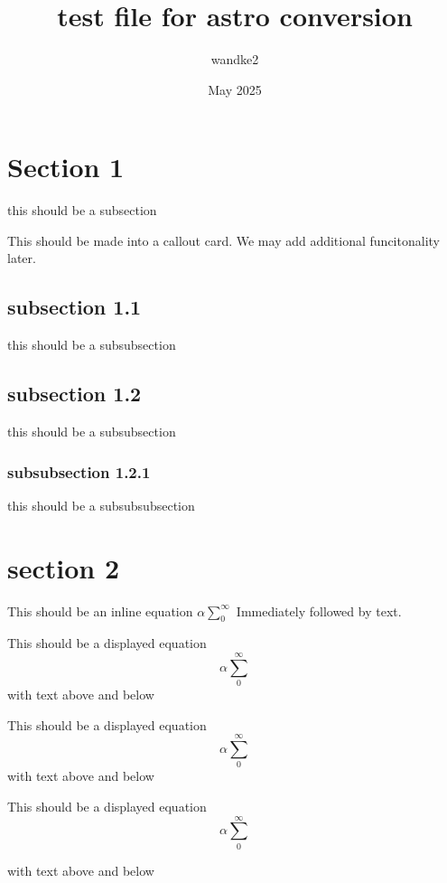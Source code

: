 \documentclass{article}
\title{test file for astro conversion}
\author{wandke2 }
\date{May 2025}
\newenvironment{callout}
{
    }
    { 
    }
\begin{document}
\maketitle

\section{Section 1}
this should be a subsection

\begin{callout}
    This should be made into a callout card. We may add additional funcitonality later.
\end{callout}

\subsection{subsection 1.1}
this should be a subsubsection

\subsection{subsection 1.2}
this should be a subsubsection

\subsubsection{subsubsection 1.2.1}
this should be a subsubsubsection

\section{section 2}

This should be an inline equation  $\alpha \sum_0^\infty$  Immediately followed by text. 



This should be a displayed equation
\begin{equation}
    \alpha \sum_0^\infty
\end{equation}
with text above and below


This should be a displayed equation
$$
    \alpha \sum_0^\infty
$$
with text above and below

This should be a displayed equation
\[\alpha \sum_0^\infty \]    

with text above and below
\end{document}
